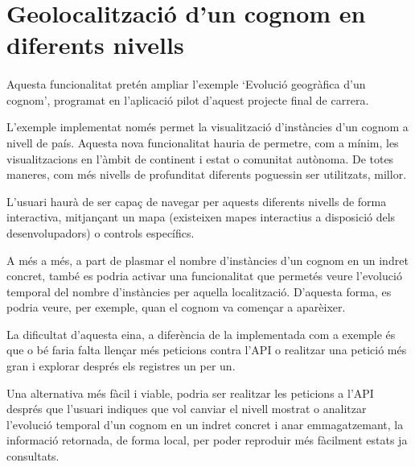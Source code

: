 \section{Geolocalització d'un cognom en diferents nivells}

    \paragraph{}
    Aquesta funcionalitat pretén ampliar l'exemple `Evolució geogràfica d'un cognom', programat en l'aplicació pilot d'aquest projecte final de carrera.

    L'exemple implementat només permet la visualització d'instàncies d'un cognom a nivell de país. Aquesta nova funcionalitat hauria de permetre, com a mínim, les visualitzacions en l'àmbit de continent i estat o comunitat autònoma. De totes maneres, com més nivells de profunditat diferents poguessin ser utilitzats, millor.

    L'usuari haurà de ser capaç de navegar per aquests diferents nivells de forma interactiva, mitjançant un mapa (existeixen mapes interactius a disposició dels desenvolupadors) o controls específics.

    A més a més, a part de plasmar el nombre d'instàncies d'un cognom en un indret concret, també es podria activar una funcionalitat que permetés veure l'evolució temporal del nombre d'instàncies per aquella localització. D'aquesta forma, es podria veure, per exemple, quan el cognom va començar a aparèixer.

    La dificultat d'aquesta eina, a diferència de la implementada com a exemple és que o bé faria falta llençar més peticions contra l'API o realitzar una petició més gran i explorar després els registres un per un.

    Una alternativa més fàcil i viable, podria ser realitzar les peticions a l'API després que l'usuari indiques que vol canviar el nivell mostrat o analitzar l'evolució temporal d'un cognom en un indret concret i anar emmagatzemant, la informació retornada, de forma local, per poder reproduir més fàcilment estats ja consultats.
